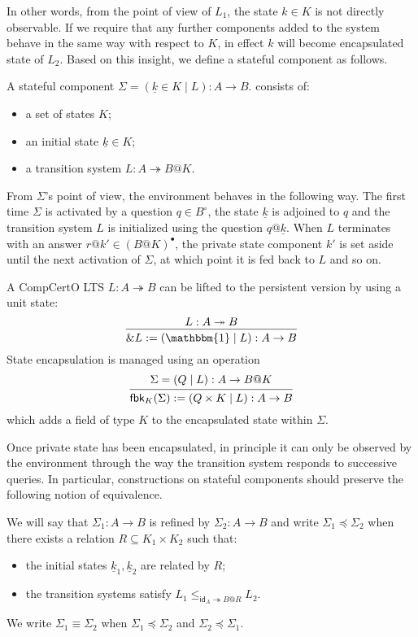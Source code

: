 \documentclass[acmsmall,screen,review,anonymous]{acmart}
\newcommand{\kw}[1]{\ensuremath{ \mathsf{#1} }}
\newcommand{\que}{\circ}
\newcommand{\ans}{\bullet}
\renewcommand{\preceq}{\preccurlyeq}
\newcommand{\intl}[1]{\underline{#1}}
\begin{document}
In other words,
from the point of view of $L_1$,
the state $k \in K$ is not directly observable.
If we require that any further components
added to the system
behave in the same way with respect to $K$,
in effect $k$ will become encapsulated state of $L_2$.
Based on this insight,
we define a stateful component as follows.

\begin{definition} \label{def:slts}
A stateful component
$\Sigma = (\intl{k} \in K \mid L) : A \rightarrow B$.
consists of:
\begin{itemize}
  \item a set of states $K$;
  \item an initial state $\intl{k} \in K$;
  \item a transition system $L : A \twoheadrightarrow B@K$.
\end{itemize}
\end{definition}

From $\Sigma$'s point of view,
the environment behaves in the following way.
The first time $\Sigma$ is activated by a question $q \in B^\que$,
the state $\intl{k}$ is adjoined to $q$
and the transition system $L$ is initialized using the question $q@\intl{k}$.
When $L$ terminates with an answer $r@k' \in (B@K)^\ans$,
the private state component $k'$
is set aside until
the next activation of $\Sigma$,
at which point it is fed back to $L$ and so on.

A CompCertO LTS $L : A \twoheadrightarrow B$
can be lifted to the persistent version
by using a unit state:
\[
  \begin{prooftree}
    \hypo{L : A \twoheadrightarrow B}
    \infer1{\&L := (\mathbbm{1} \mid L) : A \rightarrow B}
  \end{prooftree}
\]
State encapsulation is managed using an operation
\[
  \begin{prooftree}
    \hypo{\Sigma = (Q \mid L) : A \rightarrow B@K}
    \infer1{\mathsf{fbk}_K(\Sigma) := (Q \times K \mid L) : A \rightarrow B}
  \end{prooftree}
\]
which adds a field of type $K$ to the encapsulated state within $\Sigma$.

Once private state has been encapsulated,
in principle it can only be observed by the environment
through the way the transition system responds
to successive queries.
In particular,
constructions on stateful components
should preserve the following notion of equivalence.

\begin{definition} \label{def:ssim}
We will say that $\Sigma_1 : A \rightarrow B$
is refined by $\Sigma_2 : A \rightarrow B$
and write $\Sigma_1 \preceq \Sigma_2$
when there exists a relation $R \subseteq K_1 \times K_2$
such that:
\begin{itemize}
  \item the initial states $\intl{k}_1, \intl{k}_2$ are related by $R$;
  \item the transition systems satisfy
    $L_1 \le_{\kw{id}_A \twoheadrightarrow B@R} L_2$.
\end{itemize}
We write $\Sigma_1 \equiv \Sigma_2$ when
$\Sigma_1 \preceq \Sigma_2$ and
$\Sigma_2 \preceq \Sigma_1$.
\end{definition}
\end{document}

